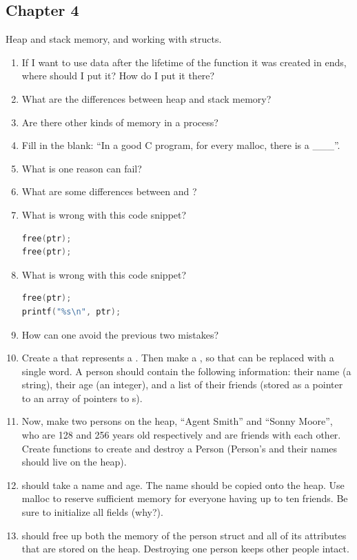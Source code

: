 \subsection{Chapter 4}

Heap and stack memory, and working with structs.

\begin{enumerate}
\item If I want to use data after the lifetime of the function it was created in ends, where should I put it? How do I put it there?
\item What are the differences between heap and stack memory?
\item Are there other kinds of memory in a process?
\item Fill in the blank: ``In a good C program, for every malloc, there is a \_\_\_''.
\item What is one reason  can fail?
\item What are some differences between  and ?
\item What is wrong with this code snippet?
\begin{lstlisting}[language=C]
free(ptr);
free(ptr);
\end{lstlisting}
\item What is wrong with this code snippet?
\begin{lstlisting}[language=C]
free(ptr);
printf("%s\n", ptr);
\end{lstlisting}
\item How can one avoid the previous two mistakes?
\item Create a  that represents a .
  Then make a , so that  can be replaced with a single word.
  A person should contain the following information: their name (a string), their age (an integer), and a list of their friends (stored as a pointer to an array of pointers to s).
\item Now, make two persons on the heap, ``Agent Smith'' and ``Sonny Moore'', who are 128 and 256 years old respectively and are friends with each other.
Create functions to create and destroy a Person (Person's and their names should live on the heap).
\item {} should take a name and age.
  The name should be copied onto the heap.
  Use malloc to reserve sufficient memory for everyone having up to ten friends.
  Be sure to initialize all fields (why?).
\item {} should free up both the memory of the person struct and all of its attributes that are stored on the heap. Destroying one person keeps other people intact.
\end{enumerate}

